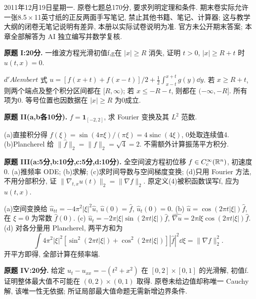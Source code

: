 2011年12月19日星期一. 原卷七题总170分, 要求列明定理和条件. 期末卷实际允许一张8.5\,$\times$\,11英寸纸的正反两面手写笔记, 禁止其他书籍、笔记、计算器; 这与教学大纲的闭卷无笔记说明有差异, 本册以实际试卷说明为准. 官方未公开期末答案; 本章全部解答为 AI 独立编写并数学复核.
\begin{exercise}\label{exam:fI}
\textbf{原题 I:20分.} 一维波方程光滑初值f,g在 $|x|\ge R$ 消失, 证明 $t>0$, $|x|\ge R+t$ 时 $u(t,x)=0$.
\end{exercise}
\begin{solution}
$d'Alembert$ 式 $u=[f(x+t)+f(x-t)]/2+\tfrac12\int_{x-t}^{x+t}g(y)\dd y$. 若 $x\ge R+t$, 则两个端点及整个积分区间都在 $[R,\infty)$; 若 $x\le-R-t$, 则都在 $(-\infty,-R]$. 所有项为0. 等号位置也因数据在 $|x|\ge R$ 为0成立.
\end{solution}
\begin{exercise}\label{exam:fII}
\textbf{原题 II(a,b各10分).} $f=\mathbf1_{[-2,2]}$, 求 Fourier 变换及其 $L^2$ 范数.
\end{exercise}
\begin{solution}
(a)直接积分得 $\widehat f(\xi)=\sin(4\pi\xi)/(\pi\xi)=4\operatorname{sinc}(4\xi)$, 0处取连续值4.
(b)Plancherel 给 $\|\widehat f\|_2=\|f\|_2=\sqrt4=2$. 不需额外计算振荡平方积分.
\end{solution}
\begin{exercise}\label{exam:fIII}
\textbf{原题 III(a:5分,b:10分,c:5分,d:10分).} 全空间波方程初位移 $f\in C_c^\infty(\mathbb R^n)$, 初速度0. (a)推频率 ODE; (b)求解; (c)求时间导数与空间梯度变换; (d)只用 Fourier 方法, 不用分部积分, 证 $\|\nabla_{t,x}u(t)\|_2=\|\nabla f\|_2$. 原定义(4)被积函数误写f, 应为 $u(t,x)$.
\end{exercise}
\begin{solution}
(a)空间变换给 $\widehat u_{tt}=-4\pi^2|\xi|^2\widehat u$, $\widehat u(0)=\widehat f$, $\widehat u_t(0)=0$.
(b) $\widehat u=\cos(2\pi t|\xi|)\widehat f$, 在 $\xi=0$ 为常数 $\widehat f(0)$.
(c) $\widehat u_t=-2\pi|\xi|\sin(2\pi t|\xi|)\widehat f$, $\widehat{\nabla u}=2\pi\ii\xi\cos(2\pi t|\xi|)\widehat f$.
(d) 对各分量用 Plancherel, 两平方和为
\[
\int4\pi^2|\xi|^2[\sin^2(2\pi t|\xi|)+\cos^2(2\pi t|\xi|)]|\widehat f|^2\dd\xi
=\|\nabla f\|_2^2.
\]
开平方即得, 全部计算在频率端.
\end{solution}
\begin{exercise}\label{exam:fIV}
\textbf{原题 IV:20分.} 给定 $u_t-u_{xx}=-(t^2+x^2)$ 在 $[0,2]\times[0,1]$ 的光滑解, 初值f. 证明整体最大值不可能在 $(0,2)\times(0,1)$ 取得. 原卷未给边值却称唯一 Cauchy 解, 该唯一性无依据; 所证局部最大值命题无需新增边界条件.
\end{exercise}
